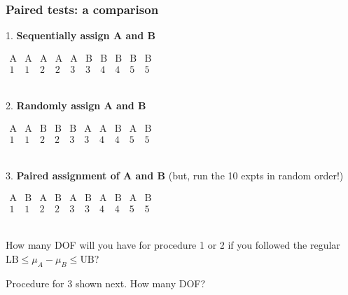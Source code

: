 \begin{frame}\frametitle{Paired tests: a comparison}

	1. \textbf{Sequentially assign A and B} {\color{myOrange}{(don't ever do this!)}}

	$
	\begin{array}{cccccccccc}
		\text{A} & \text{A} & \text{A} & \text{A} & \text{A} & \text{B} & \text{B} & \text{B} & \text{B} & \text{B} \\
		1 & 1 & 2 & 2 & 3 & 3 & 4 & 4 & 5 & 5\\
	\end{array}
	$

	$\qquad$

	2. \textbf{Randomly assign A and B} {\color{myOrange}{(commonality between pairs won't cancel)}}

	$
	\begin{array}{cccccccccc}
		\text{A} & \text{A} & \text{B} & \text{B} & \text{B} & \text{A} & \text{A} & \text{B} & \text{A} & \text{B} \\
		1 & 1 & 2 & 2 & 3 & 3 & 4 & 4 & 5 & 5\\
	\end{array}
	$

	$\qquad$

	3. \textbf{Paired assignment of A and B} (but, run the 10 expts in random order!)

	$
	\begin{array}{cccccccccc}
		\text{A} & \text{B} & \text{A} & \text{B} & \text{A} & \text{B} & \text{A} & \text{B} & \text{A} & \text{B} \\
		1 & 1 & 2 & 2 & 3 & 3 & 4 & 4 & 5 & 5\\
	\end{array}
	$

	$\qquad$

	How many DOF will you have for procedure 1 or 2 if you followed the regular $\text{LB} \leq \mu_A - \mu_B \leq \text{UB}$?

	Procedure for 3 shown next. How many DOF?
\end{frame}

